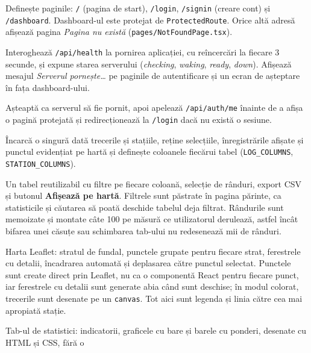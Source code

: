 \documentclass[11pt,a4paper]{article}
\newcommand{\code}[1]{\texttt{#1}}
\newcommand{\file}[1]{\texttt{#1}}
\newcommand{\ui}[1]{\textsf{\textbf{#1}}}
\begin{document}
\begin{description}[style=nextline,leftmargin=1.2cm]
  \item[\file{src/App.tsx}] Definește paginile: \code{/} (pagina de start),
    \code{/login}, \code{/signin} (creare cont) și \code{/dashboard}.
    Dashboard-ul este protejat de \code{ProtectedRoute}. Orice altă adresă
    afișează pagina \emph{Pagina nu există} (\file{pages/NotFoundPage.tsx}).
  \item[\file{components/ServerStatus.tsx}] Interoghează \code{/api/health}
    la pornirea aplicației, cu reîncercări la fiecare 3 secunde, și
    expune starea serverului (\emph{checking}, \emph{waking}, \emph{ready},
    \emph{down}). Afișează mesajul \emph{Serverul pornește\dots} pe paginile
    de autentificare și un ecran de așteptare în fața dashboard-ului.
  \item[\file{components/ProtectedRoute.tsx}] Așteaptă ca serverul să fie
    pornit, apoi apelează \code{/api/auth/me} înainte de a afișa o pagină
    protejată și redirecționează la \code{/login} dacă nu există o sesiune.
  \item[\file{pages/DashboardPage.tsx}] Încarcă o singură dată trecerile și
    stațiile, reține selecțiile, înregistrările afișate și punctul evidențiat
    pe hartă și definește coloanele fiecărui tabel (\code{LOG\_COLUMNS},
    \code{STATION\_COLUMNS}).
  \item[\file{components/DataPanel.tsx}] Un tabel reutilizabil cu filtre pe
    fiecare coloană, selecție de rânduri, export CSV și butonul
    \ui{Afișează pe hartă}. Filtrele sunt păstrate în pagina părinte, ca
    statisticile și căutarea să poată deschide tabelul deja filtrat. Rândurile
    sunt memoizate și montate câte 100 pe măsură ce utilizatorul derulează,
    astfel încât bifarea unei căsuțe sau schimbarea tab-ului nu redesenează
    mii de rânduri.
  \item[\file{components/GeoMap.tsx}] Harta Leaflet: stratul de fundal,
    punctele grupate pentru fiecare strat, ferestrele cu detalii, încadrarea
    automată și deplasarea către punctul selectat. Punctele sunt create direct
    prin Leaflet, nu ca o componentă React pentru fiecare punct, iar
    ferestrele cu detalii sunt generate abia când sunt deschise; în modul
    colorat, trecerile sunt desenate pe un \code{canvas}. Tot aici sunt
    legenda și linia către cea mai apropiată stație.
  \item[\file{components/StatsPanel.tsx}] Tab-ul de statistici: indicatorii,
    graficele cu bare și barele cu ponderi, desenate cu HTML și CSS, fără o

\end{description}
\end{document}
